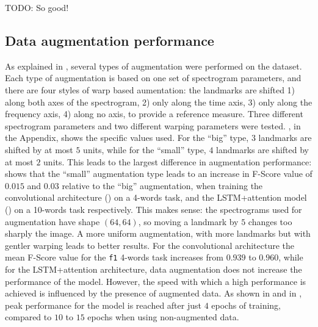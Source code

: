 TODO: So good!

\subsection{Data augmentation performance}
\label{sec:augmentation_performance}


As explained in , several types of augmentation
were performed on the dataset.
%
%
Each type of augmentation is based on one set of spectrogram parameters, and
there are four styles of warp based aumentation: the landmarks are shifted 1)
along both axes of the spectrogram, 2) only along the time axis, 3) only along
the frequency axis, 4) along no axis, to provide a reference measure. Three
different spectrogram parameters and two different warping parameters were
tested. , in the Appendix, shows the specific values used.
For the ``big'' type, $3$ landmarks are shifted by at most $5$ units, while for
the ``small'' type, $4$ landmarks are shifted by at most $2$ units.
This leads to the largest difference in augmentation performance:
 shows that the ``small''
augmentation type leads to an increase in F-Score value of $0.015$ and $0.03$
relative to the ``big'' augmentation, when training the convolutional
architecture () on a 4-words task, and the
LSTM+attention model () on a 10-words task
respectively.
%
This makes sense: the spectrograms used for augmentation have shape $(64, 64)$,
so moving a landmark by $5$ changes too sharply the image. A more uniform
augmentation, with more landmarks but with gentler warping leads to better
results.
%
For the convolutional architecture the mean F-Score value for the \texttt{f1}
4-words task increases from $0.939$ to $0.960$, while for the LSTM+attention
architecture, data augmentation does not increase the performance of the model.
However, the speed with which a high performance is achieved is influenced by
the presence of augmented data. As shown in
 and in
, peak performance for the model is
reached after just $4$ epochs of training, compared to $10$ to $15$ epochs when
using non-augmented data.


